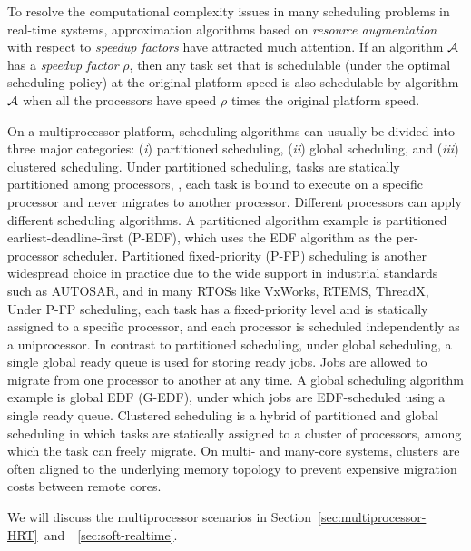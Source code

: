To resolve the computational complexity issues in many scheduling problems in real-time systems, approximation algorithms based on \textit{resource augmentation} with respect to \emph{speedup factors} have attracted much attention.  If an algorithm ${\cal A}$ has a \emph{speedup factor} $\rho$, then any task set that is schedulable (under the optimal scheduling policy) at the original platform speed is also schedulable by algorithm ${\cal A}$ when all the processors have speed $\rho$ times the original platform speed.





On a multiprocessor platform, scheduling algorithms can usually be divided into three major categories: (\textit{i}) partitioned scheduling, (\textit{ii}) global scheduling, and (\textit{iii}) clustered scheduling. 
Under partitioned scheduling, tasks are statically partitioned among processors, \ie, each task is bound to execute on a specific processor and never migrates to another processor. Different processors can apply different scheduling algorithms. A partitioned algorithm example is partitioned earliest-deadline-first (P-EDF), which uses the EDF algorithm as the per-processor scheduler. 
Partitioned fixed-priority (P-FP) scheduling is another widespread
choice in practice due to the wide support in industrial standards
such as AUTOSAR, and in many RTOSs like VxWorks, RTEMS, ThreadX, \etc
Under P-FP scheduling, each task has a fixed-priority level and is statically assigned to a specific processor, and each processor is scheduled independently as a uniprocessor.  
 In contrast to partitioned scheduling, under global scheduling, a single global ready queue is used for storing ready jobs.  Jobs are allowed to migrate from one processor to another at any time. A global scheduling algorithm example is global EDF (G-EDF), under which jobs are EDF-scheduled using a single ready queue.  
 Clustered scheduling is a hybrid of partitioned and global scheduling in which tasks are statically assigned to a cluster of processors, among which the task can freely migrate. On multi- and many-core systems, clusters are often aligned to the underlying memory topology to prevent expensive migration costs between remote cores. %

We will discuss the multiprocessor scenarios in Section~\ref{sec:multiprocessor-HRT}~and~\mysectionref{}~\ref{sec:soft-realtime}.



  
  
  
